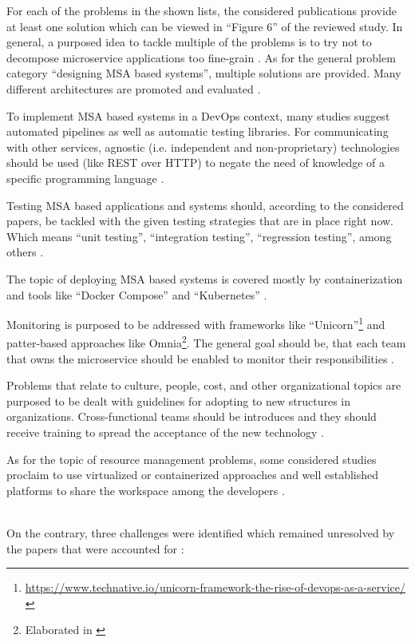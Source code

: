 For each of the problems in the shown lists, the considered publications
provide at least one solution which can be viewed in ``Figure 6''
of the reviewed study. In general, a purposed idea to tackle multiple
of the problems is to try not to decompose microservice applications
too fine-grain \cite{waseem:SMSMSADevOps}. As for the general problem
category ``designing MSA based systems'', multiple solutions are provided.
Many different architectures are promoted and evaluated \cite{waseem:SMSMSADevOps}.

To implement MSA based systems in a DevOps context, many studies suggest
automated pipelines as well as automatic testing libraries. For communicating
with other services, agnostic (i.e. independent and non-proprietary)
technologies should be used (like REST over HTTP)
to negate the need of knowledge of a specific programming language 
\cite{waseem:SMSMSADevOps}.

Testing MSA based applications and systems should, according to the considered
papers, be tackled with the given testing strategies that are in place
right now. Which means ``unit testing'', ``integration testing'',
``regression testing'', among others \cite{waseem:SMSMSADevOps}.

The topic of deploying MSA based systems is covered mostly by containerization
and tools like ``Docker Compose'' and ``Kubernetes'' \cite{waseem:SMSMSADevOps}.

Monitoring is purposed to be addressed with frameworks like 
``Unicorn''\footnote{\url{https://www.technative.io/unicorn-framework-the-rise-of-devops-as-a-service/}}
and patter-based approaches like Omnia\footnote{Elaborated in \cite{miglerina:Omnia}}.
The general goal should be, that each team that owns the microservice should be enabled
to monitor their responsibilities \cite{waseem:SMSMSADevOps}.

Problems that relate to culture, people, cost, and other organizational
topics are purposed to be dealt with guidelines for adopting to
new structures in organizations. Cross-functional teams should be introduces
and they should receive training to spread the acceptance of the
new technology \cite{waseem:SMSMSADevOps}.

As for the topic of resource management problems, some considered
studies proclaim to use virtualized or containerized approaches
and well established platforms to share the workspace among
the developers \cite{waseem:SMSMSADevOps}.

~\\
On the contrary, three challenges were identified which
remained unresolved by the papers that were accounted for \cite{waseem:SMSMSADevOps}:

